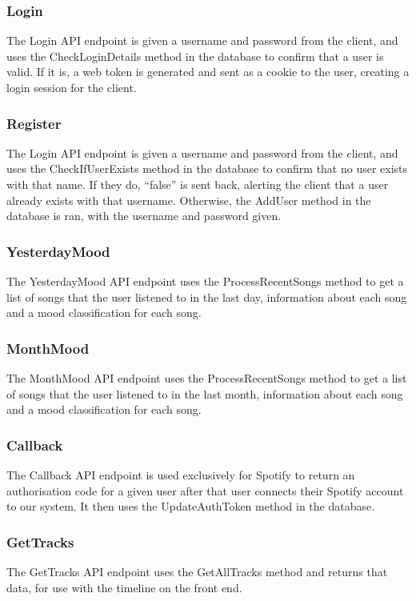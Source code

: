 \documentclass[11pt]{report}
\begin{document}
\subsubsection{Login}
The Login API endpoint is given a username and password from the client, and uses the CheckLoginDetails method in the database to confirm that a user is valid. If it is, a web token is generated and sent as a cookie to the user, creating a login session for the client.

\subsubsection{Register}
The Login API endpoint is given a username and password from the client, and uses the CheckIfUserExists method in the database to confirm that no user exists with that name. If they do, “false” is sent back, alerting the client that a user already exists with that username. Otherwise, the AddUser method in the database is ran, with the username and password given.

\subsubsection{YesterdayMood}
The YesterdayMood API endpoint uses the ProcessRecentSongs method to get a list of songs that the user listened to in the last day, information about each song and a mood classification for each song.

\subsubsection{MonthMood}
The MonthMood API endpoint uses the ProcessRecentSongs method to get a list of songs that the user listened to in the last month, information about each song and a mood classification for each song.

\subsubsection{Callback}
The Callback API endpoint is used exclusively for Spotify to return an authorisation code for a given user after that user connects their Spotify account to our system. It then uses the UpdateAuthToken method in the database.

\subsubsection{GetTracks}
The GetTracks API endpoint uses the GetAllTracks method and returns that data, for use with the timeline on the front end.
\end{document}
